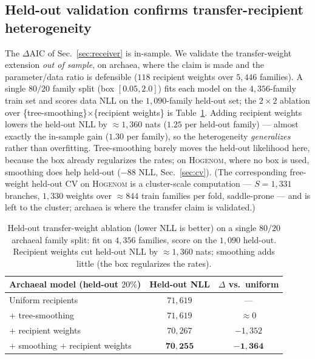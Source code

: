 \documentclass[11pt]{article}
\begin{document}
\subsection{Held-out validation confirms transfer-recipient heterogeneity}
\label{sec:ablation}
\noindent The $\Delta$AIC of Sec.~\ref{sec:receiver} is in-sample. We validate the
transfer-weight extension \emph{out of sample}, on archaea, where the claim is made
and the parameter/data ratio is defensible ($118$ recipient weights over $5{,}446$
families). A single $80/20$ family split (box $[0.05,2.0]$) fits each model on the
$4{,}356$-family train set and scores data NLL on the $1{,}090$-family held-out set;
the $2\times2$ ablation over \{tree-smoothing\}$\times$\{recipient weights\} is
Table~\ref{tab:ablation}. Adding recipient weights lowers the held-out NLL by
$\approx\!1{,}360$ nats ($1.25$ per held-out family) --- almost exactly the in-sample
gain ($1.30$ per family), so the heterogeneity \emph{generalizes} rather than
overfitting. Tree-smoothing barely moves the held-out likelihood here, because the
box already regularizes the rates; on \textsc{Hogenom}, where no box is used,
smoothing does help held-out ($-88$ NLL, Sec.~\ref{sec:cv}). (The corresponding
free-weight held-out CV on \textsc{Hogenom} is a cluster-scale computation ---
$S{=}1{,}331$ branches, $1{,}330$ weights over $\approx\!844$ train families per
fold, saddle-prone --- and is left to the cluster; archaea is where the
transfer claim is validated.)

\begin{table}[t]\centering
\caption{Held-out transfer-weight ablation (lower NLL is better) on a single
$80/20$ archaeal family split: fit on $4{,}356$ families, score on the $1{,}090$
held-out. Recipient weights cut held-out NLL by $\approx\!1{,}360$ nats; smoothing
adds little (the box regularizes the rates).}
\label{tab:ablation}
\begin{tabular}{lcc}
\toprule
Archaeal model (held-out $20\%$) & Held-out NLL & $\Delta$ vs.\ uniform \\
\midrule
Uniform recipients                & $71{,}619$            & --- \\
\;+ tree-smoothing                 & $71{,}619$            & $\approx 0$ \\
\;+ recipient weights              & $70{,}267$            & $-1{,}352$ \\
\;+ smoothing $+$ recipient weights & $\mathbf{70{,}255}$  & $\mathbf{-1{,}364}$ \\
\bottomrule
\end{tabular}
\end{table}
\end{document}
